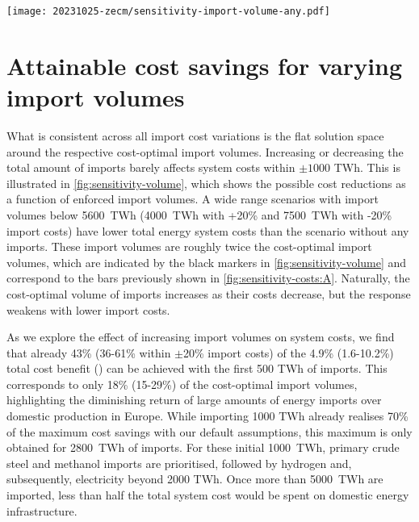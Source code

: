 
\begin{figure*}
    \texttt{[image: 20231025-zecm/sensitivity-import-volume-any.pdf]}
    \caption{\textbf{Sensitivity of import volume on total system cost and composition.}
        The dashed line splits total system cost into domestic and foreign cost.
        Dotted lines indicate the profile of lowest total system cost attainable
        for given import volumes and different levels of import costs. The black
        markers denote the maximum cost reductions and cost-optimal import
        volume for a given import cost level (extreme points of the profiles).
        Steel is included in energy terms applying 2.1 kWh/kg as released by the
        oxidation of iron. Cost alterations are uniformly applied to all imports
        opotions but direct electricity imports. }
    \label{fig:sensitivity-volume}
\end{figure*}

\section*{Attainable cost savings for varying import volumes}

What is consistent across all import cost variations is the flat solution space
around the respective cost-optimal import volumes. Increasing or decreasing the
total amount of imports barely affects system costs within $\pm 1000$ TWh. This
is illustrated in \cref{fig:sensitivity-volume}, which shows the possible cost
reductions as a function of enforced import volumes. A wide range scenarios with
import volumes below 5600~TWh (4000~TWh with +20\% and 7500~TWh with -20\%
import costs) have lower total energy system costs than the scenario without any
imports. These import volumes are roughly twice the cost-optimal import volumes,
which are indicated by the black markers in \cref{fig:sensitivity-volume} and
correspond to the bars previously shown in \cref{fig:sensitivity-costs:A}.
Naturally, the cost-optimal volume of imports increases as their costs decrease,
but the response weakens with lower import costs.

As we explore the effect of increasing import volumes on system costs, we find
that already 43\% (36-61\% within $\pm$20\% import costs) of the 4.9\%
(1.6-10.2\%) total cost benefit () can be achieved with the first 500
TWh of imports. This corresponds to only 18\% (15-29\%) of the cost-optimal
import volumes, highlighting the diminishing return of large amounts of energy
imports over domestic production in Europe. While importing 1000 TWh already
realises 70\% of the maximum cost savings with our default assumptions, this
maximum is only obtained for 2800~TWh of imports. For these initial 1000~TWh,
primary crude steel and methanol imports are prioritised, followed by hydrogen
and, subsequently, electricity beyond 2000 TWh. Once more than 5000~TWh are
imported, less than half the total system cost would be spent on domestic energy
infrastructure.

